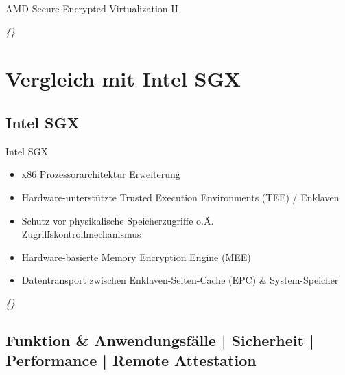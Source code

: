\documentclass{sdqbeamer}
\begin{document}
\begin{frame}{AMD Secure Encrypted Virtualization II}
\begin{minipage}{0.29\linewidth}
\begin{center}
			\small\textit{\{\cite{kaplan}\}}
		\end{center}
	\end{minipage}
\end{frame}


\section{Vergleich mit Intel SGX}

\subsection{Intel SGX}
\begin{frame}{Intel SGX}
	\begin{itemize}
		\item x86 Prozessorarchitektur Erweiterung
		\item Hardware-unterstützte Trusted Execution Environments (TEE) / Enklaven
		\item Schutz vor physikalische Speicherzugriffe o.Ä.\\
			Zugriffskontrollmechanismus
		\item Hardware-basierte Memory Encryption Engine (MEE)
		\item Datentransport zwischen Enklaven-Seiten-Cache (EPC) \& System-Speicher
	\end{itemize}
	\vfill
	\small\textit{\{\cite{costan, knauth, mofrad, swami}\}}
\end{frame}

\subsection{Funktion \& Anwendungsfälle | Sicherheit | Performance | Remote Attestation}
\end{document}

